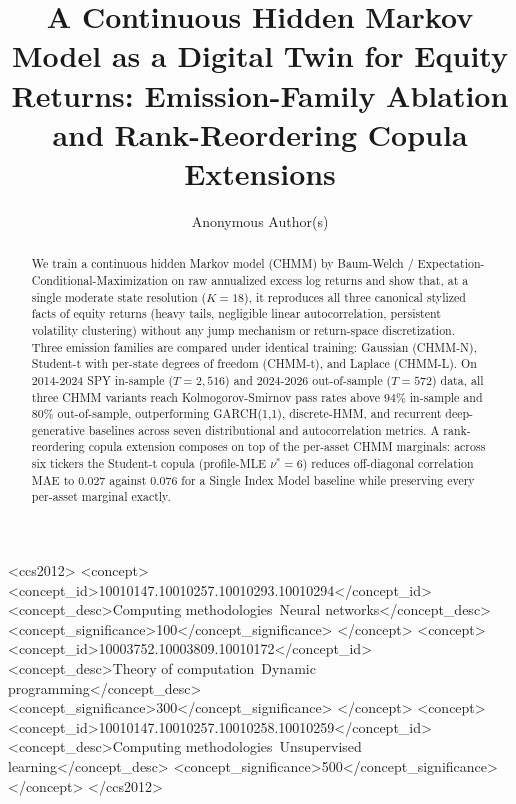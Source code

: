 \documentclass[sigconf,anonymous,nonacm=true]{acmart}
\title{A Continuous Hidden Markov Model as a Digital Twin for Equity Returns:
  Emission-Family Ablation and Rank-Reordering Copula Extensions}
\author{Anonymous Author(s)}
\affiliation{%
  \institution{Submission to ICAIF 2026 (double-blind)}
  \city{}
  \country{}
}
\begin{document}
\begin{abstract}
We train a continuous hidden Markov model (CHMM) by Baum-Welch /
Expectation-Conditional-Maximization on raw annualized excess log returns and
show that, at a single moderate state resolution ($K = 18$), it reproduces all
three canonical stylized facts of equity returns (heavy tails, negligible
linear autocorrelation, persistent volatility clustering) without any jump
mechanism or return-space discretization. Three emission families are
compared under identical training: Gaussian (CHMM-N), Student-t with
per-state degrees of freedom (CHMM-t), and Laplace (CHMM-L). On 2014-2024
SPY in-sample ($T = 2{,}516$) and 2024-2026 out-of-sample ($T = 572$) data,
all three CHMM variants reach Kolmogorov-Smirnov pass rates above $94\%$
in-sample and $80\%$ out-of-sample, outperforming GARCH(1,1), discrete-HMM,
and recurrent deep-generative baselines across seven distributional and
autocorrelation metrics. A rank-reordering copula extension composes on top
of the per-asset CHMM marginals: across six tickers the Student-t copula
(profile-MLE $\nu^{*} = 6$) reduces off-diagonal correlation MAE to $0.027$
against $0.076$ for a Single Index Model baseline while preserving every
per-asset marginal exactly.
\end{abstract}

\begin{CCSXML}
<ccs2012>
<concept>
<concept_id>10010147.10010257.10010293.10010294</concept_id>
<concept_desc>Computing methodologies~Neural networks</concept_desc>
<concept_significance>100</concept_significance>
</concept>
<concept>
<concept_id>10003752.10003809.10010172</concept_id>
<concept_desc>Theory of computation~Dynamic programming</concept_desc>
<concept_significance>300</concept_significance>
</concept>
<concept>
<concept_id>10010147.10010257.10010258.10010259</concept_id>
<concept_desc>Computing methodologies~Unsupervised learning</concept_desc>
<concept_significance>500</concept_significance>
</concept>
</ccs2012>
\end{CCSXML}



\maketitle
\end{document}
